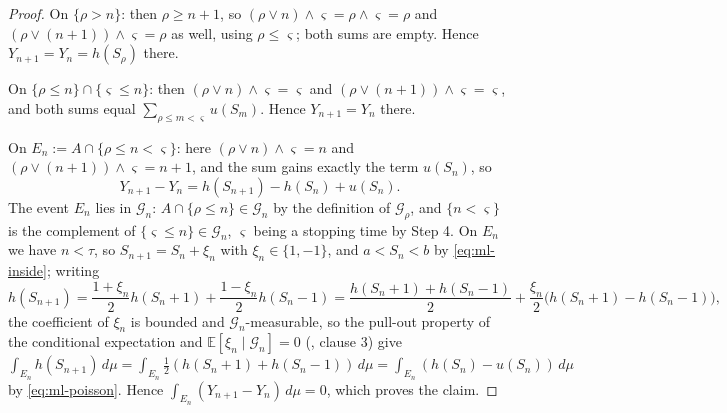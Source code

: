 \begin{proof}
On $\{\rho>n\}$: then $\rho\ge n+1$, so
$(\rho\vee n)\wedge\varsigma=\rho\wedge\varsigma=\rho$ and
$(\rho\vee(n+1))\wedge\varsigma=\rho$ as well, using $\rho\le\varsigma$; both
sums are empty. Hence $Y_{n+1}=Y_n=h(S_\rho)$ there.

On $\{\rho\le n\}\cap\{\varsigma\le n\}$: then
$(\rho\vee n)\wedge\varsigma=\varsigma$ and
$(\rho\vee(n+1))\wedge\varsigma=\varsigma$, and both sums equal
$\sum_{\rho\le m<\varsigma}u(S_m)$. Hence $Y_{n+1}=Y_n$ there.

On $E_n:=A\cap\{\rho\le n<\varsigma\}$: here
$(\rho\vee n)\wedge\varsigma=n$ and
$(\rho\vee(n+1))\wedge\varsigma=n+1$, and the sum gains exactly the term
$u(S_n)$, so
\[
  Y_{n+1}-Y_n=h(S_{n+1})-h(S_n)+u(S_n).
\]
The event $E_n$ lies in $\mathcal G_n$: $A\cap\{\rho\le n\}\in\mathcal G_n$ by
the definition of $\mathcal G_\rho$, and
$\{n<\varsigma\}$ is the complement of $\{\varsigma\le n\}\in\mathcal G_n$,
$\varsigma$ being a stopping time by Step 4. On $E_n$ we have $n<\tau$, so
$S_{n+1}=S_n+\xi_n$ with $\xi_n\in\{1,-1\}$, and $a<S_n<b$ by
\eqref{eq:ml-inside}; writing
\[
  h(S_{n+1})=\frac{1+\xi_n}{2}h(S_n+1)+\frac{1-\xi_n}{2}h(S_n-1)
   =\frac{h(S_n+1)+h(S_n-1)}{2}
     +\frac{\xi_n}{2}\bigl(h(S_n+1)-h(S_n-1)\bigr),
\]
the coefficient of $\xi_n$ is bounded and $\mathcal G_n$-measurable, so the
pull-out property of the conditional expectation and
$\mathbb E[\xi_n\mid\mathcal G_n]=0$ (, clause 3) give
$\int_{E_n}h(S_{n+1})\,d\mu
 =\int_{E_n}\tfrac12(h(S_n+1)+h(S_n-1))\,d\mu
 =\int_{E_n}(h(S_n)-u(S_n))\,d\mu$ by \eqref{eq:ml-poisson}. Hence
$\int_{E_n}(Y_{n+1}-Y_n)\,d\mu=0$, which proves the claim.


\end{proof}
